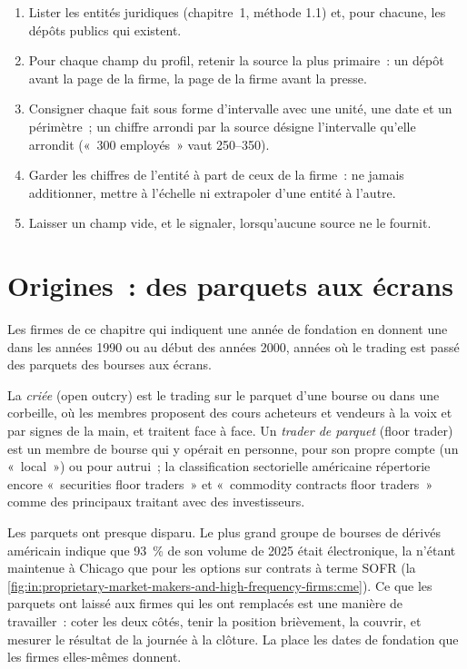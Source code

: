 \begin{method}\label{met:in:proprietary-market-makers-and-high-frequency-firms:build}
\begin{enumerate}
\item Lister les entités juridiques (chapitre~1, méthode 1.1) et, pour chacune, les dépôts publics qui existent.
\item Pour chaque champ du profil, retenir la source la plus primaire~: un dépôt avant la page de la firme, la page de la firme
avant la presse.
\item Consigner chaque fait sous forme d'intervalle avec une unité, une date et un périmètre~; un chiffre arrondi par la source désigne l'intervalle qu'elle arrondit
(«~300 employés~» vaut 250--350).
\item Garder les chiffres de l'entité à part de ceux de la firme~: ne jamais additionner, mettre à l'échelle ni extrapoler d'une entité à l'autre.
\item Laisser un champ vide, et le signaler, lorsqu'aucune source ne le fournit.
\end{enumerate}
\end{method}

\section{Origines~: des parquets aux écrans}

Les firmes de ce chapitre qui indiquent une année de fondation en donnent une dans les années 1990 ou au début des années 2000, années où
le trading est passé des parquets des bourses aux écrans.

\begin{definition}\label{def:in:proprietary-market-makers-and-high-frequency-firms:floor}
La \emph{criée} (open outcry) est le trading sur le parquet d'une bourse ou dans une corbeille, où les membres proposent des cours acheteurs et vendeurs
à la voix et par signes de la main, et traitent face à face. Un \emph{trader de parquet} (floor trader) est un membre de bourse qui
y opérait en personne, pour son propre compte (un «~local~») ou pour autrui~; la classification sectorielle américaine répertorie encore
«~securities floor traders~» et «~commodity contracts floor traders~» comme des principaux traitant avec des investisseurs.
\end{definition}

Les parquets ont presque disparu. Le plus grand groupe de bourses de dérivés américain indique que 93~\% de son volume de 2025 était
électronique, la  n'étant maintenue à Chicago que pour les options sur contrats à terme SOFR
(la \cref{fig:in:proprietary-market-makers-and-high-frequency-firms:cme}). Ce que les parquets ont laissé aux firmes qui
les ont remplacés est une manière de travailler~: coter les deux côtés, tenir la position brièvement, la couvrir, et mesurer le résultat de la journée
à la clôture. La  place les dates de fondation que les
firmes elles-mêmes donnent.

